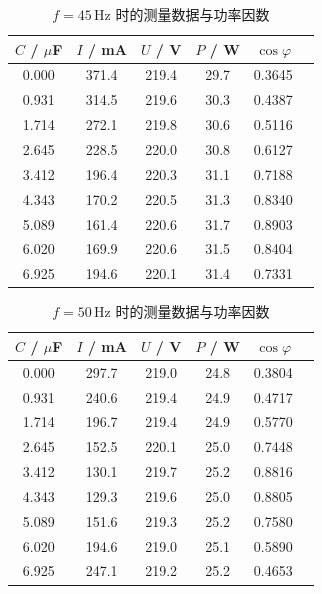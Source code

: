 \documentclass{Phyport}
\begin{document}
\begin{table}[H]
    \centering
    \caption{$f=45$\,Hz 时的测量数据与功率因数}
    \label{tab:45}
    \small
    \setlength{\tabcolsep}{5pt}
    \begin{tabular}{cccccc}
        \toprule
        $C$ / $\mu$F & $I$ / mA & $U$ / V & $P$ / W & $\cos\varphi$ \\
        \midrule
        0.000 & 371.4 & 219.4 & 29.7 & 0.3645 \\
        0.931 & 314.5 & 219.6 & 30.3 & 0.4387 \\
        1.714 & 272.1 & 219.8 & 30.6 & 0.5116 \\
        2.645 & 228.5 & 220.0 & 30.8 & 0.6127 \\
        3.412 & 196.4 & 220.3 & 31.1 & 0.7188 \\
        4.343 & 170.2 & 220.5 & 31.3 & 0.8340 \\
        5.089 & 161.4 & 220.6 & 31.7 & 0.8903 \\
        6.020 & 169.9 & 220.6 & 31.5 & 0.8404 \\
        6.925 & 194.6 & 220.1 & 31.4 & 0.7331 \\
        \bottomrule
    \end{tabular}
\end{table}

\begin{table}[H]
    \centering
    \caption{$f=50$\,Hz 时的测量数据与功率因数}
    \label{tab:50}
    \small
    \setlength{\tabcolsep}{5pt}
    \begin{tabular}{cccccc}
        \toprule
        $C$ / $\mu$F & $I$ / mA & $U$ / V & $P$ / W & $\cos\varphi$ \\
        \midrule
        0.000 & 297.7 & 219.0 & 24.8 & 0.3804 \\
        0.931 & 240.6 & 219.4 & 24.9 & 0.4717 \\
        1.714 & 196.7 & 219.4 & 24.9 & 0.5770 \\
        2.645 & 152.5 & 220.1 & 25.0 & 0.7448 \\
        3.412 & 130.1 & 219.7 & 25.2 & 0.8816 \\
        4.343 & 129.3 & 219.6 & 25.0 & 0.8805 \\
        5.089 & 151.6 & 219.3 & 25.2 & 0.7580 \\
        6.020 & 194.6 & 219.0 & 25.1 & 0.5890 \\
        6.925 & 247.1 & 219.2 & 25.2 & 0.4653 \\
        \bottomrule
    \end{tabular}
\end{table}
\end{document}
